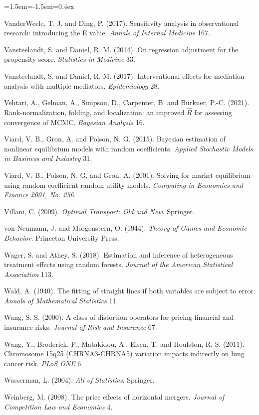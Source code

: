 \begin{list}{}{\leftmargin=1.5em\itemindent=-1.5em\itemsep=0.4ex}
\item VanderWeele, T. J. and Ding, P. (2017). Sensitivity analysis in observational research: introducing the E value. \emph{Annals of Internal Medicine} 167.
\item Vansteelandt, S. and Daniel, R. M. (2014). On regression adjustment for the propensity score. \emph{Statistics in Medicine} 33.
\item Vansteelandt, S. and Daniel, R. M. (2017). Interventional effects for mediation analysis with multiple mediators. \emph{Epidemiology} 28.
\item Vehtari, A., Gelman, A., Simpson, D., Carpenter, B. and B\"urkner, P.-C. (2021). Rank-normalization, folding, and localization: an improved $\widehat R$ for assessing convergence of MCMC. \emph{Bayesian Analysis} 16.
\item Viard, V. B., Gron, A. and Polson, N. G. (2015). Bayesian estimation of nonlinear equilibrium models with random coefficients. \emph{Applied Stochastic Models in Business and Industry} 31.
\item Viard, V. B., Polson, N. G. and Gron, A. (2001). Solving for market equilibrium using random coefficient random utility models. \emph{Computing in Economics and Finance 2001, No. 256}.
\item Villani, C. (2009). \emph{Optimal Transport: Old and New}. Springer.
\item von Neumann, J. and Morgenstern, O. (1944). \emph{Theory of Games and Economic Behavior}. Princeton University Press.
\item Wager, S. and Athey, S. (2018). Estimation and inference of heterogeneous treatment effects using random forests. \emph{Journal of the American Statistical Association} 113.
\item Wald, A. (1940). The fitting of straight lines if both variables are subject to error. \emph{Annals of Mathematical Statistics} 11.
\item Wang, S. S. (2000). A class of distortion operators for pricing financial and insurance risks. \emph{Journal of Risk and Insurance} 67.
\item Wang, Y., Broderick, P., Matakidou, A., Eisen, T. and Houlston, R. S. (2011). Chromosome 15q25 (CHRNA3-CHRNA5) variation impacts indirectly on lung cancer risk. \emph{PLoS ONE} 6.
\item Wasserman, L. (2004). \emph{All of Statistics}. Springer.
\item Weinberg, M. (2008). The price effects of horizontal mergers. \emph{Journal of Competition Law and Economics} 4.

\end{list}
